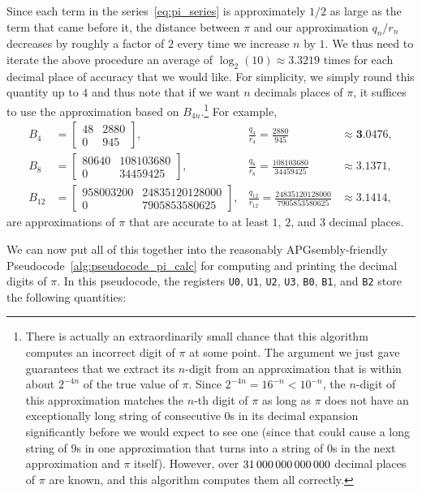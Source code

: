 Since each term in the series~\eqref{eq:pi_series} is approximately $1/2$ as large as the term that came before it, the distance between $\pi$ and our approximation $q_n/r_n$ decreases by roughly a factor of $2$ every time we increase $n$ by $1$. We thus need to iterate the above procedure an average of $\log_2(10) \approx 3.3219$ times for each decimal place of accuracy that we would like. For simplicity, we simply round this quantity up to $4$ and thus note that if we want $n$ decimals places of $\pi$, it suffices to use the approximation based on $B_{4n}$.\footnote{There is actually an extraordinarily small chance that this algorithm computes an incorrect digit of $\pi$ at some point. The argument we just gave guarantees that we extract its $n$-digit from an approximation that is within about $2^{-4n}$ of the true value of $\pi$. Since $2^{-4n} = 16^{-n} < 10^{-n}$, the $n$-digit of this approximation matches the $n$-th digit of $\pi$ as long as $\pi$ does not have an exceptionally long string of consecutive $0$s in its decimal expansion significantly before we would expect to see one (since that could cause a long string of $9$s in one approximation that turns into a string of $0$s in the next approximation and $\pi$ itself). However, over $31{\,}000{\,}000{\,}000{\,}000$ decimal places of $\pi$ are known, and this algorithm computes them all correctly.} For example,
\begin{align*}
	B_4 & = \begin{bmatrix}
		48 & 2880 \\
		0 & 945
	\end{bmatrix}, & \frac{q_4}{r_4} = \frac{2880}{945} & \approx \mathbf{3}.0476, \\
	B_8 & = \begin{bmatrix}
		80640 & 108103680 \\
		0 & 34459425
	\end{bmatrix}, & \frac{q_8}{r_8} = \frac{108103680}{34459425} & \approx \mathbf{3.1}371, \\
	B_{12} & = \begin{bmatrix}
		958003200 & 24835120128000 \\
		0 & 7905853580625
	\end{bmatrix}, & \frac{q_{12}}{r_{12}} = \frac{24835120128000}{7905853580625} & \approx \mathbf{3.14}14,
\end{align*}
are approximations of $\pi$ that are accurate to at least $1$, $2$, and $3$ decimal places.

We can now put all of this together into the reasonably APGsembly-friendly Pseudocode~\ref{alg:pseudocode_pi_calc} for computing and printing the decimal digits of $\pi$. In this pseudocode, the registers \texttt{U0}, \texttt{U1}, \texttt{U2}, \texttt{U3}, \texttt{B0}, \texttt{B1}, and \texttt{B2} store the following quantities:\smallskip


